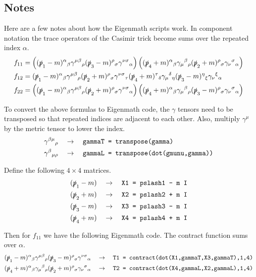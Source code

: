 \documentclass[12pt]{article}
\begin{document}
\subsection*{Notes}
Here are a few notes about how the Eigenmath scripts work.
In component notation the trace operators of the Casimir trick become sums over the repeated index $\alpha$.
\begin{align*}
f_{11}&=
\left(
(\slashed{p}_1-m)^\alpha{}_\beta
\gamma^{\mu\beta}{}_\rho
(\slashed{p}_3-m)^\rho{}_\sigma
\gamma^{\nu\sigma}{}_\alpha
\right)
\left(
(\slashed{p}_4+m)^\alpha{}_\beta
\gamma_\mu{}^\beta{}_\rho
(\slashed{p}_2+m)^\rho{}_\sigma
\gamma_\nu{}^\sigma{}_\alpha
\right)
\\
f_{12}&=
(\slashed{p}_1-m)^\alpha{}_\beta
\gamma^{\mu\beta}{}_\rho
(\slashed{p}_2+m)^\rho{}_\sigma
\gamma^{\nu\sigma}{}_\tau
(\slashed{p}_4+m)^\tau{}_\delta
\gamma_\mu{}^\delta{}_\eta
(\slashed{p}_3-m)^\eta{}_\xi
\gamma_\nu{}^\xi{}_\alpha
\\
f_{22}&=
\left(
(\slashed{p}_1-m)^\alpha{}_\beta
\gamma^{\mu\beta}{}_\rho
(\slashed{p}_2+m)^\rho{}_\sigma
\gamma^{\nu\sigma}{}_\alpha
\right)
\left(
(\slashed{p}_4+m)^\alpha{}_\beta
\gamma_\mu{}^\beta{}_\rho
(\slashed{p}_3-m)^\rho{}_\sigma
\gamma_\nu{}^\sigma{}_\alpha
\right)
\end{align*}

\noindent
To convert the above formulas to Eigenmath code,
the $\gamma$ tensors need to be transposed
so that repeated indices are adjacent to each other.
Also, multiply $\gamma^\mu$ by the metric tensor to lower the index.
\begin{align*}
\gamma^{\beta\mu}{}_\rho\quad&\rightarrow\quad
\text{\tt gammaT = transpose(gamma)}\\
\gamma^\beta{}_{\mu\rho}\quad&\rightarrow\quad
\text{\tt gammaL = transpose(dot(gmunu,gamma))}
\end{align*}

\noindent
Define the following $4\times4$ matrices.
\begin{align*}
(\slashed{p}_1-m)\quad&\rightarrow\quad\text{\tt X1 = pslash1 - m I}\\
(\slashed{p}_2+m)\quad&\rightarrow\quad\text{\tt X2 = pslash2 + m I}\\
(\slashed{p}_3-m)\quad&\rightarrow\quad\text{\tt X3 = pslash3 - m I}\\
(\slashed{p}_4+m)\quad&\rightarrow\quad\text{\tt X4 = pslash4 + m I}
\end{align*}

\noindent
Then for $f_{11}$ we have the following Eigenmath code.
The contract function sums over $\alpha$.
\begin{align*}
(\slashed{p}_1-m)^\alpha{}_\beta
\gamma^{\mu\beta}{}_\rho
(\slashed{p}_3-m)^\rho{}_\sigma
\gamma^{\nu\sigma}{}_\alpha
\quad&\rightarrow\quad
\text{\tt T1 = contract(dot(X1,gammaT,X3,gammaT),1,4)}\\
(\slashed{p}_4+m)^\alpha{}_\beta
\gamma_\mu{}^\beta{}_\rho
(\slashed{p}_2+m)^\rho{}_\sigma
\gamma_\nu{}^\sigma{}_\alpha
\quad&\rightarrow\quad
\text{\tt T2 = contract(dot(X4,gammaL,X2,gammaL),1,4)}
\end{align*}
\end{document}
